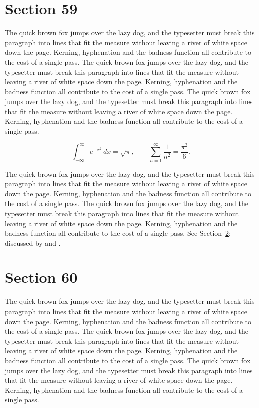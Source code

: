 \documentclass{article}
\begin{document}
\section{Section 59}
\label{sec:59}
The quick brown fox jumps over the lazy dog, and the typesetter must break this paragraph into lines that fit the measure without leaving a river of white space down the page. Kerning, hyphenation and the badness function all contribute to the cost of a single pass. The quick brown fox jumps over the lazy dog, and the typesetter must break this paragraph into lines that fit the measure without leaving a river of white space down the page. Kerning, hyphenation and the badness function all contribute to the cost of a single pass. The quick brown fox jumps over the lazy dog, and the typesetter must break this paragraph into lines that fit the measure without leaving a river of white space down the page. Kerning, hyphenation and the badness function all contribute to the cost of a single pass. 

\begin{equation}\label{eq:59}
\int_{-\infty}^{\infty} e^{-x^{2}}\,dx = \sqrt{\pi}, \qquad
\sum_{n=1}^{\infty} \frac{1}{n^{2}} = \frac{\pi^{2}}{6}.
\end{equation}

The quick brown fox jumps over the lazy dog, and the typesetter must break this paragraph into lines that fit the measure without leaving a river of white space down the page. Kerning, hyphenation and the badness function all contribute to the cost of a single pass. The quick brown fox jumps over the lazy dog, and the typesetter must break this paragraph into lines that fit the measure without leaving a river of white space down the page. Kerning, hyphenation and the badness function all contribute to the cost of a single pass. 
See Section~\ref{sec:60}; discussed by \textcite{k5} and \textcite{l2}.
\section{Section 60}
\label{sec:60}
The quick brown fox jumps over the lazy dog, and the typesetter must break this paragraph into lines that fit the measure without leaving a river of white space down the page. Kerning, hyphenation and the badness function all contribute to the cost of a single pass. The quick brown fox jumps over the lazy dog, and the typesetter must break this paragraph into lines that fit the measure without leaving a river of white space down the page. Kerning, hyphenation and the badness function all contribute to the cost of a single pass. The quick brown fox jumps over the lazy dog, and the typesetter must break this paragraph into lines that fit the measure without leaving a river of white space down the page. Kerning, hyphenation and the badness function all contribute to the cost of a single pass. 
\end{document}
